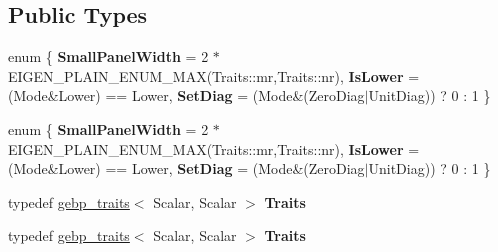 \subsection*{Public Types}
\begin{DoxyCompactItemize}
\item 
\mbox{\label{struct_eigen_1_1internal_1_1product__triangular__matrix__matrix_3_01_scalar_00_01_index_00_01_mocecf6b0a946de08ae1ae622ae91f7d88_a265d0a7c0db64e6df528280d0862d2e7}} 
enum \{ {\bfseries Small\+Panel\+Width} = 2 $\ast$ E\+I\+G\+E\+N\+\_\+\+P\+L\+A\+I\+N\+\_\+\+E\+N\+U\+M\+\_\+\+M\+AX(Traits\+:\+:mr,Traits\+:\+:nr), 
{\bfseries Is\+Lower} = (Mode\&Lower) == Lower, 
{\bfseries Set\+Diag} = (Mode\&(Zero\+Diag$\vert$\+Unit\+Diag)) ? 0 \+: 1
 \}
\item 
\mbox{\label{struct_eigen_1_1internal_1_1product__triangular__matrix__matrix_3_01_scalar_00_01_index_00_01_mocecf6b0a946de08ae1ae622ae91f7d88_acf75d109ea77b2e7847954019ce627c9}} 
enum \{ {\bfseries Small\+Panel\+Width} = 2 $\ast$ E\+I\+G\+E\+N\+\_\+\+P\+L\+A\+I\+N\+\_\+\+E\+N\+U\+M\+\_\+\+M\+AX(Traits\+:\+:mr,Traits\+:\+:nr), 
{\bfseries Is\+Lower} = (Mode\&Lower) == Lower, 
{\bfseries Set\+Diag} = (Mode\&(Zero\+Diag$\vert$\+Unit\+Diag)) ? 0 \+: 1
 \}
\item 
\mbox{\label{struct_eigen_1_1internal_1_1product__triangular__matrix__matrix_3_01_scalar_00_01_index_00_01_mocecf6b0a946de08ae1ae622ae91f7d88_a259733da8fa6b08909126e3026dcfbc7}} 
typedef \hyperlink{class_eigen_1_1internal_1_1gebp__traits}{gebp\+\_\+traits}$<$ Scalar, Scalar $>$ {\bfseries Traits}
\item 
\mbox{\label{struct_eigen_1_1internal_1_1product__triangular__matrix__matrix_3_01_scalar_00_01_index_00_01_mocecf6b0a946de08ae1ae622ae91f7d88_a259733da8fa6b08909126e3026dcfbc7}} 
typedef \hyperlink{class_eigen_1_1internal_1_1gebp__traits}{gebp\+\_\+traits}$<$ Scalar, Scalar $>$ {\bfseries Traits}
\end{DoxyCompactItemize}
